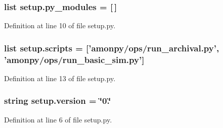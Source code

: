 \hypertarget{namespacesetup_a2f17d3b44c4dab5ffba788f40bf1397a}{
\subsubsection[{py\-\_\-modules}]{\setlength{\rightskip}{0pt plus 5cm}list setup.\-py\-\_\-modules = \mbox{[}$\,$\mbox{]}}}\label{namespacesetup_a2f17d3b44c4dab5ffba788f40bf1397a}


Definition at line 10 of file setup.\-py.

\hypertarget{namespacesetup_ac1f45f8d37050b278bf63c812b1130dd}{
\subsubsection[{scripts}]{\setlength{\rightskip}{0pt plus 5cm}list setup.\-scripts = \mbox{[}'amonpy/ops/run\-\_\-archival.\-py', 'amonpy/ops/run\-\_\-basic\-\_\-sim.\-py'\mbox{]}}}\label{namespacesetup_ac1f45f8d37050b278bf63c812b1130dd}


Definition at line 13 of file setup.\-py.

\hypertarget{namespacesetup_ab177531e7a80674a3db3de2d79eb8be7}{
\subsubsection[{version}]{\setlength{\rightskip}{0pt plus 5cm}string setup.\-version = \char`\"{}0.\char`\"{}}}\label{namespacesetup_ab177531e7a80674a3db3de2d79eb8be7}


Definition at line 6 of file setup.\-py.

